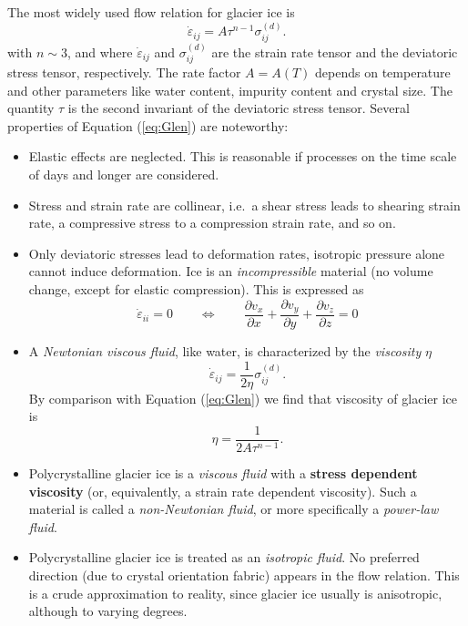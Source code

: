 \documentclass[11pt,a4paper,halfparskip]{scrartcl}
\newcommand{\epsdot}{\dot{\varepsilon}}
\begin{document}
The most widely used flow relation for glacier ice is
\citep{Glen1955,Steinemann1954}
%  
\begin{equation}
  \label{eq:Glen} \epsdot_{ij} = A \tau^{n-1}\sigma^{(d)}_{ij}.
\end{equation}
%
with $n\sim 3$, and where $\epsdot_{ij}$ and $\sigma^{(d)}_{ij}$ are
the strain rate tensor and the deviatoric stress tensor, respectively.
The rate factor $A = A(T)$ depends on temperature and other parameters
like water content, impurity content and crystal size.  The quantity
$\tau$ is the second invariant of the deviatoric stress tensor.
%
Several properties of Equation (\ref{eq:Glen}) are noteworthy:
\begin{itemize}
\item Elastic effects are neglected.  This is reasonable if processes on the
  time scale of days and longer are considered.
\item Stress and strain rate are collinear, i.e.~a shear stress leads to
  shearing strain rate, a compressive stress to a compression strain rate, and
  so on.
\item Only deviatoric stresses lead to deformation rates, isotropic pressure
  alone cannot induce deformation. Ice is an \emph{incompressible} material
  (no volume change, except for elastic compression).  This is expressed as
  \[
  \epsdot_{ii} = 0 \qquad \Longleftrightarrow \qquad
  \frac{\partial v_x}{\partial x} + \frac{\partial v_y}{\partial y} +
  \frac{\partial v_z}{\partial z} = 0
  \]
\item A \emph{Newtonian viscous fluid}, like water, is characterized by
  the \emph{viscosity} $\eta$
  \begin{equation}
    \label{eq:viscosity-newtonian}
  \epsdot_{ij} = \frac{1}{2\eta} \sigma^{(d)}_{ij}.
  \end{equation}
  By comparison with Equation (\ref{eq:Glen}) we find that viscosity of
  glacier ice is
  \[
  \eta=\frac{1}{2A\tau^{n-1}}.
  \]

\item Polycrystalline glacier ice is a \emph{viscous fluid} with a
  \textbf{stress dependent viscosity} (or, equivalently, a strain rate
  dependent viscosity).  Such a material is called a \emph{non-Newtonian
    fluid}, or more specifically a \emph{power-law fluid}.
\item Polycrystalline glacier ice is treated as an \emph{isotropic fluid}. No
  preferred direction (due to crystal orientation fabric) appears in the flow
  relation.  This is a crude approximation to reality, since glacier ice
  usually is anisotropic, although to varying degrees.
  
\end{itemize}
\end{document}
